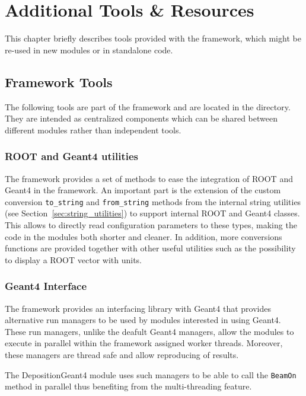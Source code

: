 \chapter{Additional Tools \& Resources}
\label{ch:additional_tools_resources}

This chapter briefly describes tools provided with the \apsq framework, which might be re-used in new modules or in standalone code.

\section{Framework Tools}

The following tools are part of the \apsq framework and are located in the  directory.
They are intended as centralized components which can be shared between different modules rather than independent tools.

\subsection{ROOT and Geant4 utilities}
\label{sec:root_and_geant4_utilities}
The framework provides a set of methods to ease the integration of ROOT and Geant4 in the framework.
An important part is the extension of the custom conversion \texttt{to\_string} and \texttt{from\_string} methods from the internal string utilities (see Section~\ref{sec:string_utilities}) to support internal ROOT and Geant4 classes.
This allows to directly read configuration parameters to these types, making the code in the modules both shorter and cleaner.
In addition, more conversions functions are provided together with other useful utilities such as the possibility to display a ROOT vector with units.

\subsection{Geant4 Interface}
\label{sec:geant4_interface}
The framework provides an interfacing library with Geant4 that provides alternative run managers to be used by modules interested in using Geant4.
These run managers, unlike the deafult Geant4 managers, allow the modules to execute in parallel within the framework assigned worker threads.
Moreover, these managers are thread safe and allow reproducing of results.

The DepositionGeant4 module uses such managers to be able to call the \texttt{BeamOn} method in parallel thus benefiting from the multi-threading feature.

